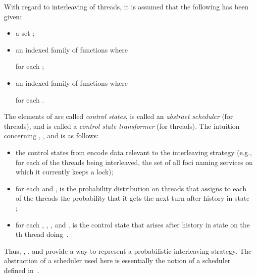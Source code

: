 \documentclass{llncs}
\begin{document}
With regard to interleaving of threads, it is assumed that the following 
has been given:
\begin{itemize}
\sloppy
\item
a set ; 
\item
an indexed family of functions 
where 

for each ;
\item
an indexed family of functions 
where 

for each .
\end{itemize}
The elements of  are called \emph{control states},  is 
called an \emph{abstract scheduler} (for  threads), and  
is called a \emph{control state transformer} (for  threads).
The intuition concerning , , and 
 is as follows:
\begin{itemize}
\item
the control states from  encode data relevant to the interleaving 
strategy (e.g., for each of the threads being interleaved, the set of 
all foci naming services on which it currently keeps a lock);
\item
for each  and ,  is the 
probability distribution on  threads that assigns to each of the 
threads the probability that it gets the next turn after history  in 
state ;
\item
for each , , , and 
,  is the control state that arises 
after history  in state  on the th thread doing~.
\end{itemize}
Thus, , , and 
 provide a way to represent a 
probabilistic interleaving strategy.
The abstraction of a scheduler used here is essentially the notion of
a scheduler defined in~\cite{SS00a}.
\end{document}
